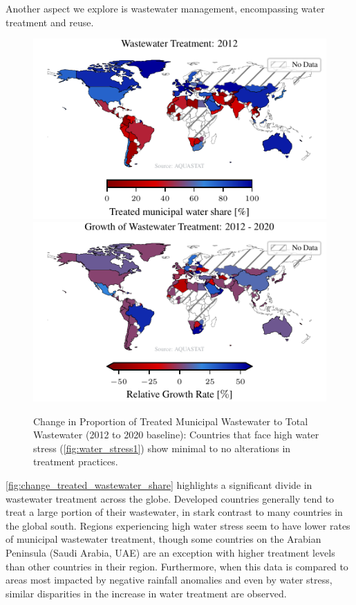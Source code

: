 \documentclass{article}
\theoremstyle{plain}
\theoremstyle{definition}
\theoremstyle{remark}
\begin{document}
Another aspect we explore is wastewater management, encompassing water treatment and reuse.  
\begin{figure}[!ht]
    \centering
    \includegraphics{fig/fig_world_map_Treated_municipal_water_share_2012.pdf}
    \includegraphics{fig/fig_growth_rate_Treated_municipal_water_share.pdf}
    \caption{Change in Proportion of Treated Municipal Wastewater to Total Wastewater (2012 to 2020 baseline): Countries that face high water stress (\autoref{fig:water_stress1}) show minimal to no alterations in treatment practices.}
    \label{fig:change_treated_wastewater_share}
\end{figure}
\autoref{fig:change_treated_wastewater_share} highlights a significant divide in wastewater treatment across the globe.
Developed countries generally tend to treat a large portion of their wastewater, in stark contrast to many countries in the global south. Regions experiencing high water stress seem to have lower rates of municipal wastewater treatment, though some countries on the Arabian Peninsula (Saudi Arabia, UAE) are an exception with higher treatment levels than other countries in their region. Furthermore, when this data is compared to areas most impacted by negative rainfall anomalies and even by water stress, similar disparities in the increase in water treatment are observed. 
\end{document}
